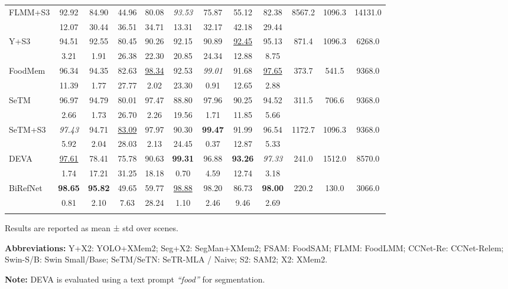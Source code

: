\documentclass[preprint,12pt]{elsarticle}
\begin{document}
\begin{table}[!htbp]
\begin{tabular}{lccccccccccc}
FLMM+S3 & 92.92 & 84.90 & 44.96 & 80.08 & \textit{93.53} & 75.87 & 55.12 & 82.38 & 8567.2 & 1096.3 & 14131.0 \\
  & 12.07 & 30.44 & 36.51 & 34.71 & 13.31 & 32.17 & 42.18 & 29.44 &  &  &  \\ \addlinespace[2pt]
\rowcolor{gray!12}
Y+S3 & 94.51 & 92.55 & 80.45 & 90.26 & 92.15 & 90.89 & \uline{92.45} & 95.13 & 871.4 & 1096.3 & 6268.0 \\
  & 3.21 & 1.91 & 26.38 & 22.30 & 20.85 & 24.34 & 12.88 & 8.75 &  &  &  \\ \addlinespace[2pt]
FoodMem & 96.34 & 94.35 & 82.63 & \uline{98.34} & 92.53 & \textit{99.01} & 91.68 & \uline{97.65} & 373.7 & 541.5 & 9368.0 \\
  & 11.39 & 1.77 & 27.77 & 2.02 & 23.30 & 0.91 & 12.65 & 2.88 &  &  &  \\ \addlinespace[2pt]
\rowcolor{gray!12}
SeTM & 96.97 & 94.79 & 80.01 & 97.47 & 88.80 & 97.96 & 90.25 & 94.52 & 311.5 & 706.6 & 9368.0 \\
  & 2.66 & 1.73 & 26.70 & 2.26 & 19.56 & 1.71 & 11.85 & 5.66 &  &  &  \\ \addlinespace[2pt]
SeTM+S3 & \textit{97.43} & 94.71 & \uline{83.09} & 97.97 & 90.30 & \textbf{99.47} & 91.99 & 96.54 & 1172.7 & 1096.3 & 9368.0 \\
  & 5.92 & 2.04 & 28.03 & 2.13 & 24.45 & 0.37 & 12.87 & 5.33 &  &  &  \\ \addlinespace[2pt]
\rowcolor{gray!12}
DEVA & \uline{97.61} & 78.41 & 75.78 & 90.63 & \textbf{99.31} & 96.88 & \textbf{93.26} & \textit{97.33} & 241.0 & 1512.0 & 8570.0 \\
  & 1.74 & 17.21 & 31.25 & 18.18 & 0.70 & 4.59 & 12.74 & 3.18 &  &  &  \\ \addlinespace[2pt]
BiRefNet & \textbf{98.65} & \textbf{95.82} & 49.65 & 59.77 & \uline{98.88} & 98.20 & 86.73 & \textbf{98.00} & 220.2 & 130.0 & 3066.0 \\
  & 0.81 & 2.10 & 7.63 & 28.24 & 1.10 & 2.46 & 9.46 & 2.69 &  &  &  \\ \addlinespace[2pt]

\bottomrule
\end{tabular}

\vspace{2mm}
\scriptsize
\raggedright
Results are reported as mean ± std over scenes. 

\textbf{Abbreviations:}
Y+X2: YOLO+XMem2; Seg+X2: SegMan+XMem2;  
FSAM: FoodSAM; FLMM: FoodLMM;  
CCNet-Re: CCNet-Relem;  
Swin-S/B: Swin Small/Base;  
SeTM/SeTN: SeTR-MLA / Naive;  
S2: SAM2; X2: XMem2.

\textbf{Note:} DEVA is evaluated using a text prompt \emph{``food''} for segmentation.
\end{table}
\end{document}
